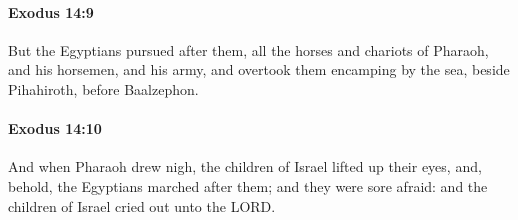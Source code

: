 		\paragraph{Exodus 14:9} %
			\label{EXODUS-14-9}

			But the Egyptians pursued after them, all the horses and chariots of Pharaoh, and his horsemen, and his army, and overtook them encamping by the sea, beside Pihahiroth, before Baalzephon.


		\paragraph{Exodus 14:10} %
			\label{EXODUS-14-10}

			And when Pharaoh drew nigh, the children of Israel lifted up their eyes, and, behold, the Egyptians marched after them; and they were sore afraid: and the children of Israel cried out unto the LORD.

